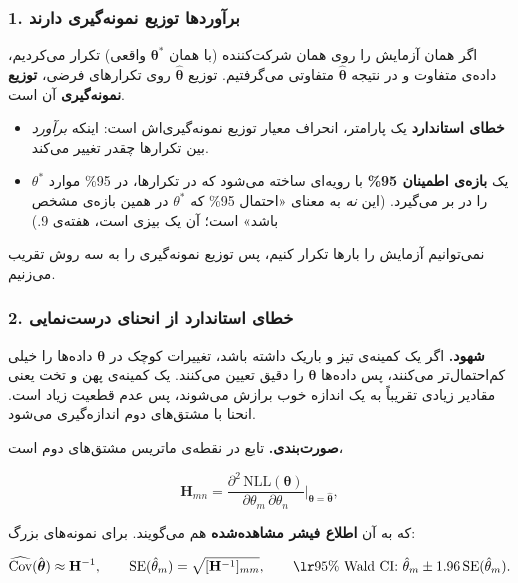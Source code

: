 \subsubsection{1. برآوردها توزیع نمونه‌گیری دارند}

اگر همان آزمایش را روی همان شرکت‌کننده (با همان
\(\boldsymbol\theta^\ast\) واقعی) تکرار می‌کردیم، داده‌ی متفاوت و در نتیجه
\(\hat{\boldsymbol\theta}\) متفاوتی می‌گرفتیم. توزیع
\(\hat{\boldsymbol\theta}\) روی تکرارهای فرضی، \textbf{توزیع نمونه‌گیری}
آن است.

\begin{itemize}
\tightlist
\item
  \textbf{خطای استاندارد}  یک پارامتر، انحراف معیار توزیع
  نمونه‌گیری‌اش است: اینکه \emph{برآورد} بین تکرارها چقدر تغییر می‌کند.
\item
  یک \textbf{بازه‌ی اطمینان 95\%} با رویه‌ای ساخته می‌شود که در تکرارها، در
  95\% موارد \(\theta^\ast\) را در بر می‌گیرد. (این \emph{نه} به معنای
  «احتمال 95\% که \(\theta^\ast\) در همین بازه‌ی مشخص باشد» است؛ آن یک
   بیزی است، هفته‌ی 9.)
\end{itemize}

نمی‌توانیم آزمایش را بارها تکرار کنیم، پس توزیع نمونه‌گیری را به سه روش
تقریب می‌زنیم.

\subsubsection{\texorpdfstring{2. خطای استاندارد از انحنای درست‌نمایی
}{2. خطای استاندارد از انحنای درست‌نمایی (Wald)}}

\textbf{شهود.} اگر  یک کمینه‌ی تیز و باریک داشته باشد، تغییرات
کوچک در \(\boldsymbol\theta\) داده‌ها را خیلی کم‌احتمال‌تر می‌کنند، پس
داده‌ها \(\boldsymbol\theta\) را دقیق تعیین می‌کنند. یک کمینه‌ی پهن و تخت
یعنی مقادیر زیادی تقریباً به یک اندازه خوب برازش می‌شوند، پس عدم قطعیت
زیاد است. انحنا با مشتق‌های دوم اندازه‌گیری می‌شود.

\textbf{صورت‌بندی.} \textbf{} تابع  در نقطه‌ی 
ماتریس مشتق‌های دوم است،

\[
\mathbf{H}_{mn} = \frac{\partial^2\, \mathrm{NLL}(\boldsymbol\theta)}{\partial\theta_m\,\partial\theta_n}\bigg|_{\boldsymbol\theta = \hat{\boldsymbol\theta}},
\]

که به آن \textbf{اطلاع فیشر مشاهده‌شده}  هم می‌گویند. برای نمونه‌های بزرگ:

\[
\widehat{\mathrm{Cov}}(\hat{\boldsymbol\theta}) \approx \mathbf{H}^{-1}, \qquad
\mathrm{SE}(\hat\theta_m) = \sqrt{[\mathbf{H}^{-1}]_{mm}}, \qquad
\text{\lr{95\% Wald CI: }} \hat\theta_m \pm 1.96\,\mathrm{SE}(\hat\theta_m).
\]

